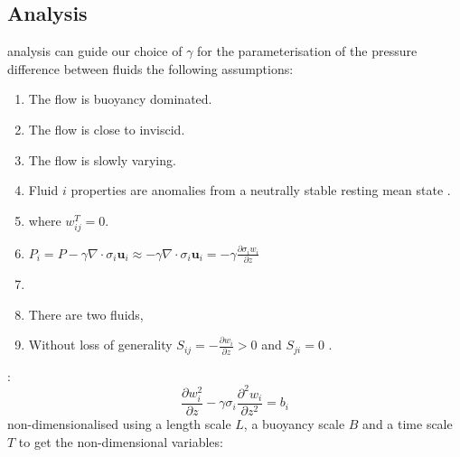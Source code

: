 \documentclass[draft]{agujournal2019}
\begin{document}

\subsection{\label{subsec:dimAnal}
 Analysis}

 analysis can guide our choice of $\gamma$ for the parameterisation of the pressure difference between fluids  the following assumptions:
\begin{enumerate}
\item The flow is buoyancy dominated.
\item The flow is close to inviscid.
\item The flow is slowly varying.
\item Fluid $i$ properties are anomalies from a neutrally stable resting
mean state 
.
\item {} where $w_{ij}^{T}=0$.
\item $P_{i}=P-\gamma\nabla\cdot\sigma_i \mathbf{u}_{i}\approx-\gamma\nabla\cdot\sigma_i\mathbf{u}_{i}=-\gamma\frac{\partial \sigma_i w_{i}}{\partial z}$
\item {}
\item There are two fluids, 
\item Without loss of generality\add[WM]{,}  $S_{ij}=-\frac{\partial w_{i}}{\partial z}>0$
and $S_{ji}=0$ .
\end{enumerate}
:
\begin{equation}
\frac{\partial w_{i}^{2}}{\partial z}-\gamma\sigma_i\frac{\partial^{2}w_{i}}{\partial z^{2}}=b_{i}\label{eq:wi_balances}
\end{equation}
 non-dimensionalised using a length scale $L$, a buoyancy scale
$B$ and a time scale $T$ to get the non-dimensional variables:
\end{document}
